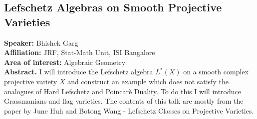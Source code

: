 \subsection*{Lefschetz Algebras on Smooth Projective Varieties} %
\noindent
\textbf{Speaker:} Bhishek Garg \\ %
\textbf{Affiliation:} JRF, Stat-Math Unit, ISI Bangalore\\ %
\textbf{Area of interest:} Algebraic Geometry\\ %

\noindent\textbf{Abstract.} I will introduce the Lefschetz algebra $L^*(X)$ on a smooth complex projective variety $X$ and construct an example which does not satisfy the analogues of Hard Lefschetz and Poincar\`e Duality. To do this I will introduce Grassmanians and flag varieties.
The contents of this talk are mostly from the paper by June Huh and Botong Wang - Lefschetz Classes on Projective Varieties.

